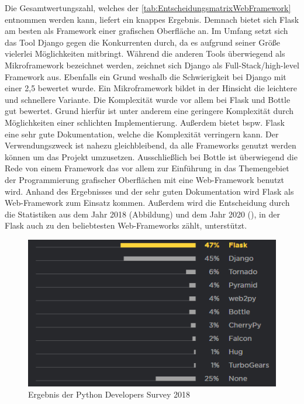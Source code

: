 \documentclass[a4paper,titlepage,halfparskip,12pt]{scrreprt}
\begin{document}
\begin{onehalfspacing}
Die Gesamtwertungszahl, welches der \autoref{tab:EntscheidungsmatrixWebFramework} entnommen werden kann, liefert ein knappes Ergebnis. Demnach bietet sich Flask am besten als Framework einer grafischen Oberfläche an. Im Umfang setzt sich das Tool Django gegen die Konkurrenten durch, da es aufgrund seiner Größe vielerlei Möglichkeiten mitbringt. Während die anderen Tools überwiegend als Mikroframework bezeichnet werden, zeichnet sich Django als Full-Stack/high-level Framework aus. Ebenfalls ein Grund weshalb die Schwierigkeit bei Django mit einer 2,5 bewertet wurde. Ein Mikroframework bildet in der Hinsicht die leichtere und schnellere Variante. Die Komplexität wurde vor allem bei Flask und Bottle gut bewertet. Grund hierfür ist unter anderem eine geringere Komplexität durch Möglichkeiten einer schlichten Implementierung. Außerdem bietet bspw. Flask eine sehr gute Dokumentation, welche die Komplexität verringern kann. Der Verwendungszweck ist nahezu gleichbleibend, da alle Frameworks genutzt werden können um das Projekt umzusetzen. Ausschließlich bei Bottle ist überwiegend die Rede von einem Framework das vor allem zur Einführung in das Themengebiet der Programmierung grafischer Oberflächen mit eine Web-Framework benutzt wird. Anhand des Ergebnisses und der sehr guten Dokumentation wird Flask als Web-Framework zum Einsatz kommen. Außerdem wird die Entscheidung durch die Statistiken aus dem Jahr 2018 (Abbildung) und dem Jahr 2020 (\cite{webframeworksStatistic}), in der Flask auch zu den beliebtesten Web-Frameworks zählt, unterstützt.
\cite{BottleDoc} \cite{CherryPyDoc} \cite{DjangoDoc} \cite{FlaskDoc}
\begin{figure}[h]
	\centering
	\includegraphics[scale=1.2]{images/FlaskSurvey2018}
	\caption{Ergebnis der Python Developers Survey 2018 \cite{pythonDeveloperSurvey2018}}
	\label{img:StatistikWebFrameworks}
\end{figure}


\end{onehalfspacing}
\end{document}

